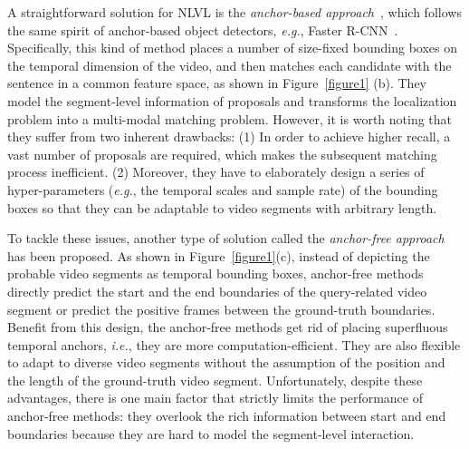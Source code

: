 \documentclass[letterpaper]{article} %
\newcommand{\ie}{\emph{i.e.}}
\newcommand{\eg}{\emph{e.g.}}
\begin{document}
A straightforward solution for NLVL is the \emph{anchor-based approach}~\cite{DBLP:conf/iccv/GaoSYN17,DBLP:conf/emnlp/HendricksWSSDR18,DBLP:conf/mm/LiuWN0CC18,DBLP:conf/aaai/ChenJ19a,DBLP:conf/wacv/GeGCN19,DBLP:conf/aaai/Xu0PSSS19,DBLP:conf/cvpr/ZhangDWWD19,ChenCMJC18,DBLP:conf/aaai/Wang0J20},
which follows the same spirit of anchor-based object detectors, \eg, Faster R-CNN~\cite{DBLP:conf/nips/RenHGS15}.
Specifically, this kind of method places a number of size-fixed bounding boxes on the temporal dimension of the video,
and then matches each candidate with the sentence in a common feature space, as shown in Figure~\ref{figure1} (b).
They model the segment-level information of proposals and transforms the localization problem into a multi-modal matching problem.
However, it is worth noting that they suffer from two inherent drawbacks:
(1) In order to achieve higher recall, a vast number of proposals are required, which makes the subsequent matching process inefficient.
(2) Moreover, they have to elaborately design a series of hyper-parameters (\eg, the temporal scales and sample rate) of the bounding boxes so that they can be adaptable to video segments with arbitrary length.

To tackle these issues, another type of solution called the  \emph{anchor-free approach}~\cite{DBLP:conf/aaai/ChenLTXZTL20,DBLP:conf/aaai/ChenJ19a,DBLP:conf/aaai/YuanM019,LuCTLX19,DBLP:conf/acl/ZhangSJZ20,DBLP:conf/wacv/OpazoMSLG20,DBLP:conf/cvpr/MunCH20} has been proposed.
As shown in Figure~\ref{figure1}(c), instead of depicting the probable video segments as temporal bounding boxes, anchor-free methods directly predict the start and the end boundaries of the query-related video segment or predict the positive frames between the ground-truth boundaries.
Benefit from this design,
the anchor-free methods get rid of placing superfluous temporal anchors, \ie, they are more computation-efficient.
They are also flexible to adapt to diverse video segments without the assumption of the position and the length of the ground-truth video segment.
Unfortunately, despite these advantages, there is one main factor that strictly limits the performance of anchor-free methods: they overlook the rich information between start and end boundaries
because they are hard to model the segment-level interaction.
\end{document}

